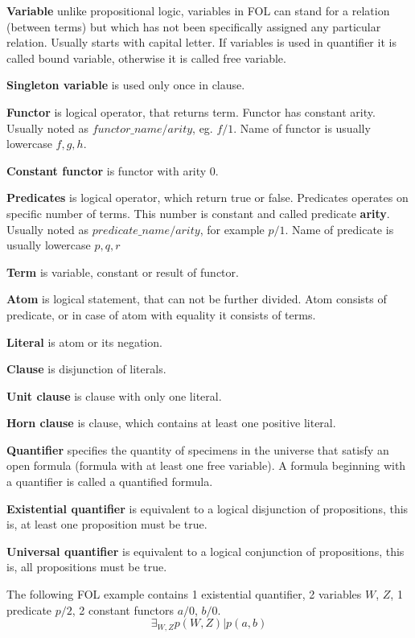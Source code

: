 \textbf{Variable}
unlike propositional logic, variables in \gls{FOL} can stand for a relation (between terms) but which has not been specifically assigned any particular relation.
Usually starts with capital letter. If variables is used in quantifier it is called bound variable, otherwise it is called free variable.

\textbf{Singleton variable}
is used only once in clause.

\textbf{Functor}
is logical operator, that returns term. Functor has constant arity. Usually noted as $functor\_name/arity$, eg. $f/1$. Name of functor  is usually lowercase $f, g, h$.

\textbf{Constant functor}
is functor with arity 0.

\textbf{Predicates}
is logical operator, which return true or false. Predicates operates on specific number of terms. This number is constant and called predicate \textbf{arity}. Usually noted as $predicate\_name/arity$, for example $p/1$. Name of predicate is usually lowercase $p, q, r$

\textbf{Term}
is variable, constant or result of functor.

\textbf{Atom}
is logical statement, that can not be further divided. Atom consists of predicate, or in case of atom with equality it consists of terms.

\textbf{Literal}
is atom or its negation.

\textbf{Clause}
is disjunction of literals.

\textbf{Unit clause}
is clause with only one literal.

\textbf{Horn clause}
is clause, which contains at least one positive literal.

\textbf{Quantifier}
specifies the quantity of specimens in the universe that satisfy an open formula (formula with at least one free variable). A formula beginning with a quantifier is called a quantified formula.

\textbf{Existential quantifier}
is equivalent to a logical disjunction of propositions, this is, at least one proposition must be true.

\textbf{Universal quantifier}
is equivalent to a logical conjunction of propositions, this is, all propositions must be true.

The following \gls{FOL} example contains 1 existential quantifier, 2 variables $W$, $Z$, 1 predicate $p/2$, 2 constant functors $a/0$, $b/0$.
\begin{equation} \label{eg:FOL_1}
  \exists_{W,Z} p(W,Z) | p(a, b)
\end{equation}

